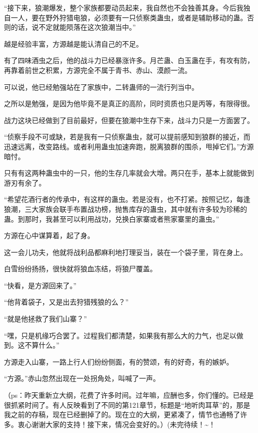 \begin{this_body}
“接下来，狼潮爆发，整个家族都要动员起来，我自然也不会独善其身。今后我独自一人，要在野外狩猎电狼，必须要有一只侦察类蛊虫，或者是辅助移动的蛊。否则的话，说不定就能陨落在这次狼潮当中。”

越是经验丰富，方源越是能认清自己的不足。

有了四味酒虫之后，他的战斗力已经暴涨许多。月芒蛊、白玉蛊在手，有攻有防，再靠着前世之积累，方源完全不属于青书、赤山、漠颜一流。

可以说，他已经勉强站在了家族中，二转蛊师的一流行列当中。

之所以是勉强，是因为他毕竟不是真正的高阶，同时资质也只是丙等，有限得很。

战力这块已经做到了目前最好，但要在狼潮中生存下来，战斗力只是一方面罢了。

“侦察手段不可或缺，若是我有一只侦察蛊虫，就可以提前感知到狼群的接近，而迅速远离，改变路线。或者利用蛊虫加速奔跑，脱离狼群的围杀，甩掉它们。”方源暗忖。

只有有这两种蛊虫中的一只，他的生存几率就会大增。两只在手，基本上就能做到游刃有余了。

“希望花酒行者的传承中，有这样的蛊虫。若是没有，也不打紧。按照记忆，每逢狼潮，三大家族会联手布置战功榜，抛售库存的蛊虫，其中就有许多较为珍稀的蛊。到那时，我甚至可以利用战功，兑换白家寨或者熊家寨里的蛊虫。”

方源在心中谋算着，起了身。

这一会儿功夫，他就将战利品都麻利地打理妥当，装在一个袋子里，背在身上。

白雪纷纷扬扬，很快就将狼血冻结，将狼尸覆盖。

“快看，是方源回来了。”

“他背着袋子，又是出去狩猎残狼的么？”

“就是他拯救了我们山寨？”

“嘿，只是机缘巧合罢了。过程我们都清楚，如果我有那么大的力气，也足以做到。这不算什么。”

方源走入山寨，一路上行人们纷纷侧面，有的赞颂，有的好奇，有的嫉妒。

“方源。”赤山忽然出现在一处拐角处，叫喊了一声。

（ps：昨天重新立大纲，花费了许多时间。过年嘛，应酬也多，你们懂的。已经是很抓紧时间了。有人反映看到了不同的第121章节，标题是“地听肉耳草”的，那是我之前的存稿，现在已经删掉了的。现在立的大纲，更紧凑了，情节也通畅了许多。衷心谢谢大家的支持！接下来，情况会变好的。）(未完待续！\~{}！

\end{this_body}

